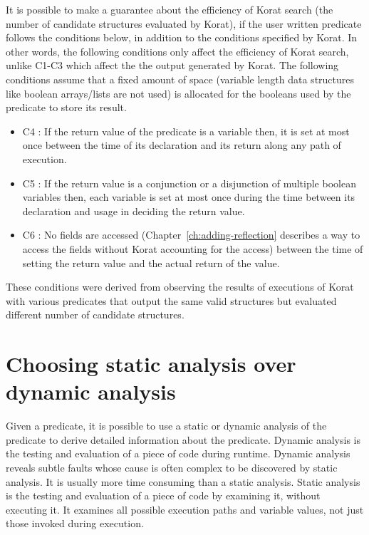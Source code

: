 \para It is possible to make a guarantee about the efficiency of Korat
search (the number of candidate structures evaluated by Korat), if the
user written predicate follows the conditions below, in addition to
the conditions specified by Korat. In other words, the following
conditions only affect the efficiency of Korat search, unlike C1-C3
which affect the the output generated by Korat. The following
conditions assume that a fixed amount of space (variable length data
structures like boolean arrays/lists are not used) is allocated for
the booleans used by the predicate to store its result.
\begin{itemize}
\item C4 : If the return value of the predicate is a variable then, it
  is set at most once between the time of its declaration and its
  return along any path of execution.
\item C5 : If the return value is a conjunction or a disjunction of
  multiple boolean variables then, each variable is set at most once
  during the time between its declaration and usage in deciding the
  return value.
\item C6 : No fields are accessed (Chapter~\ref{ch:adding-reflection}
  describes a way to access the fields without Korat accounting for
  the access) between the time of setting the return value and the
  actual return of the value.
\end{itemize}

\para These conditions were derived from observing the results of
executions of Korat with various predicates that output the same
valid structures but evaluated different number of candidate
structures.

\section{Choosing static analysis over dynamic analysis}
\label{sec:choosing-static-over-dynamic}
Given a predicate, it is possible to use a static or dynamic analysis
of the predicate to derive detailed information about the
predicate. Dynamic analysis is the testing and evaluation of a piece of
code during runtime. Dynamic analysis reveals subtle faults whose
cause is often complex to be discovered by static analysis. It is
usually more time consuming than a static analysis. Static analysis is
the testing and evaluation of a piece of code by examining it, without
executing it. It examines all possible execution paths and variable
values, not just those invoked during execution.

